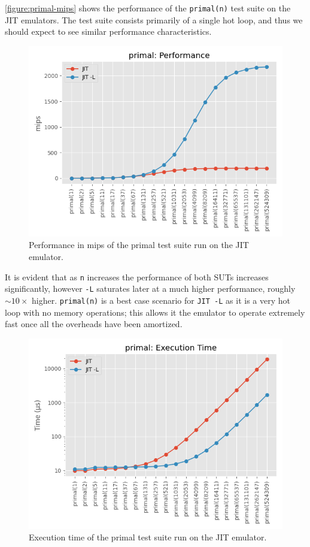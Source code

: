 \autoref{figure:primal-mips} shows the performance of the \texttt{primal(n)} test suite on the JIT emulators. The test suite consists primarily of a single hot loop, and thus we should expect to see similar performance characteristics.

\begin{figure}[H]
    \centering
    \includegraphics[scale=0.75]{output/graphs/tests/jit/primal/mips.png}
    \caption{Performance in mips of the primal test suite run on the JIT emulator.}
    \label{figure:jit-primal-mips}
\end{figure}

It is evident that as \texttt{n} increases the performance of both SUTs increases significantly, however \texttt{-L} saturates later at a much higher performance, roughly $\sim 10\times$ higher. \texttt{primal(n)} is a best case scenario for \texttt{JIT -L} as it is a very hot loop with no memory operations; this allows it the emulator to operate extremely fast once all the overheads have been amortized.

\begin{figure}[H]
    \centering
    \includegraphics[scale=0.75]{output/graphs/tests/jit/primal/time.png}
    \caption{Execution time of the primal test suite run on the JIT emulator.}
    \label{figure:jit-primal-time}
\end{figure}

